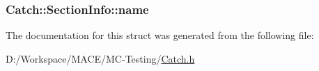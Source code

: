 \subsubsection[{\texorpdfstring{name}{name}}]{ Catch\+::\+Section\+Info\+::name}\hypertarget{struct_catch_1_1_section_info_a704c8fc662d309137e0d4f199cb7df58}{}\label{struct_catch_1_1_section_info_a704c8fc662d309137e0d4f199cb7df58}


The documentation for this struct was generated from the following file\+:\begin{DoxyCompactItemize}
\item 
D\+:/\+Workspace/\+M\+A\+C\+E/\+M\+C-\/\+Testing/\hyperlink{_catch_8h}{Catch.\+h}\end{DoxyCompactItemize}
